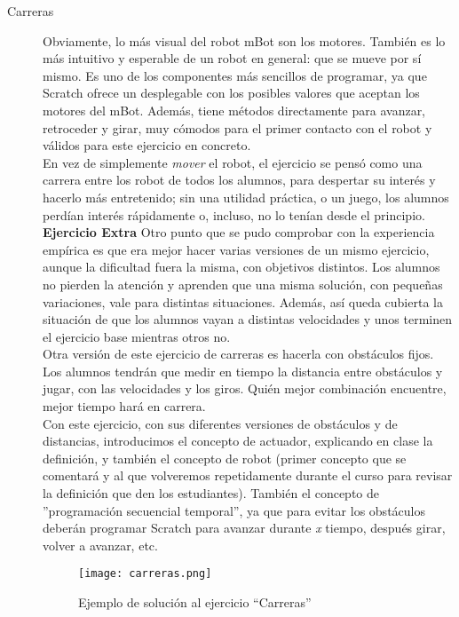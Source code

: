 \begin{description}

\item [Carreras]\label{ej:carreras}
Obviamente, lo más visual del robot mBot son los motores. También es lo más intuitivo y esperable de un robot en general: que se mueve por sí mismo. Es uno de los componentes más sencillos de programar, ya que Scratch ofrece un desplegable con los posibles valores que aceptan los motores del mBot. Además, tiene métodos directamente para avanzar, retroceder y girar, muy cómodos para el primer contacto con el robot y válidos para este ejercicio en concreto. \\
En vez de simplemente \textit{mover} el robot, el ejercicio se pensó como una carrera entre los robot de todos los alumnos, para despertar su interés y hacerlo más entretenido; sin una utilidad práctica, o un juego, los alumnos perdían interés rápidamente o, incluso, no lo tenían desde el principio. \\
\textbf{Ejercicio Extra} Otro punto que se pudo comprobar con la experiencia empírica es que era mejor hacer varias versiones de un mismo ejercicio, aunque la dificultad fuera la misma, con objetivos distintos. Los alumnos no pierden la atención y aprenden que una misma solución, con pequeñas variaciones, vale para distintas situaciones. Además, así queda cubierta la situación de que los alumnos vayan a distintas velocidades y unos terminen el ejercicio base mientras otros no.\\
Otra versión de este ejercicio de carreras es hacerla con obstáculos fijos. Los alumnos tendrán que medir en tiempo la distancia entre obstáculos y jugar, con las velocidades y los giros. Quién mejor combinación encuentre, mejor tiempo hará en carrera.\\
Con este ejercicio, con sus diferentes versiones de obstáculos y de distancias, introducimos el concepto de actuador, explicando en clase la definición, y también el concepto de robot (primer concepto que se comentará y al que volveremos repetidamente durante el curso para revisar la definición que den los estudiantes). También el concepto de ''programación secuencial temporal'', ya que para evitar los obstáculos deberán programar Scratch para avanzar durante \textit{x} tiempo, después girar, volver a avanzar, etc.
\begin{figure}[h]
	\centering
	\texttt{[image: carreras.png]}
	\label{img:carreras}
	\caption{Ejemplo de solución al ejercicio ``Carreras''}
\end{figure}

\end{description}
